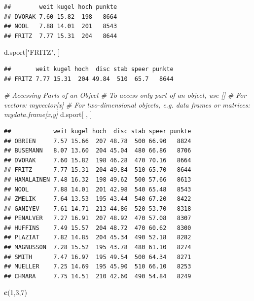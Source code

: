 \documentclass[
]{article}
\newenvironment{Shaded}{\begin{snugshade}}{\end{snugshade}}
\newcommand{\CommentTok}[1]{\textcolor[rgb]{0.56,0.35,0.01}{\textit{#1}}}
\newcommand{\DecValTok}[1]{\textcolor[rgb]{0.00,0.00,0.81}{#1}}
\newcommand{\FunctionTok}[1]{\textcolor[rgb]{0.13,0.29,0.53}{\textbf{#1}}}
\newcommand{\NormalTok}[1]{#1}
\newcommand{\StringTok}[1]{\textcolor[rgb]{0.31,0.60,0.02}{#1}}
\begin{document}
\begin{verbatim}
##        weit kugel hoch punkte
## DVORAK 7.60 15.82  198   8664
## NOOL   7.88 14.01  201   8543
## FRITZ  7.77 15.31  204   8644
\end{verbatim}

\begin{Shaded}
\begin{Highlighting}[]
\NormalTok{d.sport[}\StringTok{"FRITZ"}\NormalTok{, ]}
\end{Highlighting}
\end{Shaded}

\begin{verbatim}
##       weit kugel hoch  disc stab speer punkte
## FRITZ 7.77 15.31  204 49.84  510  65.7   8644
\end{verbatim}

\begin{Shaded}
\begin{Highlighting}[]
\CommentTok{\# Accessing Parts of an Object}
\CommentTok{\# To access only part of an object, use []}
  \CommentTok{\# For vectors: myvector[x]}
  \CommentTok{\# For two{-}dimensional objects, e.g. data frames or matrices: mydata.frame[x,y]}
\NormalTok{d.sport[ , ]}
\end{Highlighting}
\end{Shaded}

\begin{verbatim}
##            weit kugel hoch  disc stab speer punkte
## OBRIEN     7.57 15.66  207 48.78  500 66.90   8824
## BUSEMANN   8.07 13.60  204 45.04  480 66.86   8706
## DVORAK     7.60 15.82  198 46.28  470 70.16   8664
## FRITZ      7.77 15.31  204 49.84  510 65.70   8644
## HAMALAINEN 7.48 16.32  198 49.62  500 57.66   8613
## NOOL       7.88 14.01  201 42.98  540 65.48   8543
## ZMELIK     7.64 13.53  195 43.44  540 67.20   8422
## GANIYEV    7.61 14.71  213 44.86  520 53.70   8318
## PENALVER   7.27 16.91  207 48.92  470 57.08   8307
## HUFFINS    7.49 15.57  204 48.72  470 60.62   8300
## PLAZIAT    7.82 14.85  204 45.34  490 52.18   8282
## MAGNUSSON  7.28 15.52  195 43.78  480 61.10   8274
## SMITH      7.47 16.97  195 49.54  500 64.34   8271
## MUELLER    7.25 14.69  195 45.90  510 66.10   8253
## CHMARA     7.75 14.51  210 42.60  490 54.84   8249
\end{verbatim}

\begin{Shaded}
\begin{Highlighting}[]
\FunctionTok{c}\NormalTok{(}\DecValTok{1}\NormalTok{,}\DecValTok{3}\NormalTok{,}\DecValTok{7}\NormalTok{)}
\end{Highlighting}
\end{Shaded}
\end{document}

